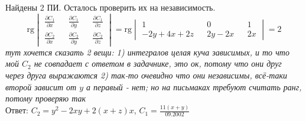 \documentclass{article}
\newcommand{\rg}{\text{rg}}
\begin{document}
Найдены 2 ПИ. Осталось проверить их на независимость.
\begin{equation*}
    \rg \begin{vmatrix}
        \frac{\partial C_1}{\partial x} && \frac{\partial C_1}{\partial y} && \frac{\partial C_1}{\partial z}\\
        \frac{\partial C_2}{\partial x} && \frac{\partial C_2}{\partial y} && \frac{\partial C_2}{\partial z}
    \end{vmatrix}= \rg \begin{vmatrix}
        1&&0&&1\\
        -2y+4x+2z &&2y-2x && 2x
    \end{vmatrix} = 2
\end{equation*}
 \textcolor[rgb]{0.480469,0.566406,0.480469}{\textit{тут хочется сказать 2 вещи: 1) интегралов целая куча зависимых, и то что мой $C_2$ не совпадает с ответом в задачнике, это ок, потому что они друг через друга выражаются 2) так-то очевидно что они независимы, всё-таки второй зависит от $y$ а перавый - нет; но на письмаках требуют считать ранг, потому проверяю так}}\\
 Ответ: $C_2=y^2-2xy+2(x+z)x$,  $C_1=\frac{11(x+y)}{09.2002}$
\end{document}
